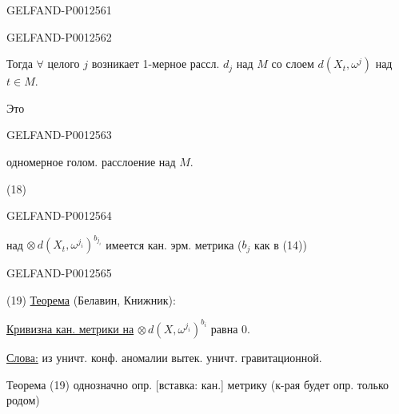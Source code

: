 \begin{GelfandAdjacentEvidence}{GELFAND-P001256}{1}
\end{GelfandAdjacentEvidence}
\begin{GelfandAdjacentEvidence}{GELFAND-P001256}{2}


Тогда $\forall$ целого $j$ возникает 1-мерное рассл. $d_j$ над $M$
со слоем $d(X_t,\omega^j)$ над $t\in M$.

Это
\end{GelfandAdjacentEvidence}
\begin{GelfandAdjacentEvidence}{GELFAND-P001256}{3}

одномерное голом. расслоение над $M$.

\noindent (18)
\end{GelfandAdjacentEvidence}
\begin{GelfandAdjacentEvidence}{GELFAND-P001256}{4}

над $\otimes\,d(X_t,\omega^{j_i})^{b_{j_i}}$ имеется кан. эрм. метрика
($b_j$ как в (14))
\end{GelfandAdjacentEvidence}
\begin{GelfandAdjacentEvidence}{GELFAND-P001256}{5}


\noindent (19) \underline{Теорема} (Белавин, Книжник):

\underline{Кривизна кан. метрики на} $\otimes\,d(X,\omega^{j_i})^{b_i}$ равна 0.

\underline{Слова:} из уничт. конф. аномалии вытек. уничт. гравитационной.

Теорема (19) однозначно опр. [вставка: кан.] метрику (к-рая будет опр. только родом)
\end{GelfandAdjacentEvidence}
